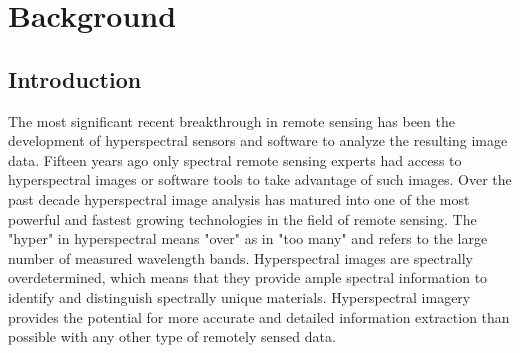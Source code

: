 \documentclass[document.tex]{subfiles}
\begin{document}
\chapter{Background}
\section{Introduction}
The most significant recent breakthrough in remote sensing has been the development of
hyperspectral sensors and software to analyze the resulting image data. Fifteen years ago
only spectral remote sensing experts had access to hyperspectral images or software tools
to take advantage of such images. Over the past decade hyperspectral image analysis
has matured into one of the most powerful and fastest growing technologies in the field
of remote sensing. The "hyper" in hyperspectral means "over" as in "too many" and
refers to the large number of measured wavelength bands. Hyperspectral images are
spectrally overdetermined, which means that they provide ample spectral information to
identify and distinguish spectrally unique materials. Hyperspectral imagery provides the
potential for more accurate and detailed information extraction than possible with any
other type of remotely sensed data.
\end{document}
